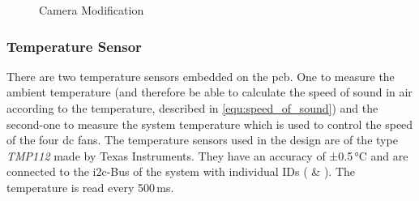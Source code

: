 \begin{figure}[h!]
    \centering
    \qquad
    \caption{Camera Modification}
    \label{fig:camera-modification}
\end{figure}


\subsubsection{Temperature Sensor}
There are two temperature sensors embedded on the \acrshort{pcb}. One to measure the ambient temperature (and therefore be able to calculate the speed of sound in air according to the temperature, described in \ref{equ:speed_of_sound}) and the second-one to measure the system temperature which is used to control the speed of the four \acrshort{dc} fans. The temperature sensors used in the design are of the type \textit{TMP112} made by Texas Instruments. They have an accuracy of ±0.5\,°C and are connected to the \acrshort{i2c}-Bus of the system with individual IDs ( \& ). The temperature is read every 500\,ms.

